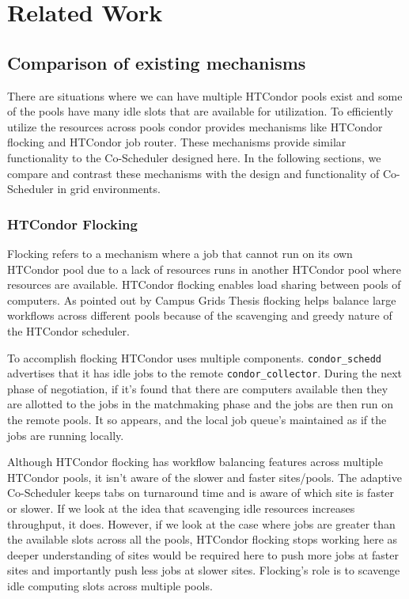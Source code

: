 \documentclass[ms,electronic,double]{nuthesis}
\begin{document}
\chapter{Related Work}

\section{Comparison of existing mechanisms}
There are situations where we can have multiple HTCondor pools exist and some of 
the pools have many idle slots that are available for utilization. To efficiently utilize the resources across pools condor provides 
mechanisms like HTCondor flocking and HTCondor job router. These mechanisms 
provide similar functionality to the Co-Scheduler designed here. In the following sections, we compare 
and contrast these mechanisms with the design and functionality of Co-Scheduler in grid environments.

\subsection{HTCondor Flocking}
Flocking refers to a mechanism where a job that cannot run on its own HTCondor pool 
due to a lack of resources runs in another HTCondor pool where resources are 
available. HTCondor flocking enables load sharing between pools of computers. As 
pointed out by Campus Grids Thesis\cite{derekThesis} flocking helps balance large workflows across different pools because of the scavenging and greedy nature 
of the HTCondor scheduler.

To accomplish flocking HTCondor uses multiple components. 
\texttt{condor\_schedd} advertises that it has idle jobs to the remote \texttt{condor\_collector}. During the next phase of negotiation, if it's found that there are computers 
available then they are allotted to the jobs in the matchmaking phase and the 
jobs are then run on the remote pools. It so appears, and the local job queue's maintained as if 
the jobs are running locally. 

Although HTCondor flocking has workflow balancing features across multiple HTCondor 
pools, it isn't aware of the slower and faster sites/pools. The adaptive Co-Scheduler 
keeps tabs on turnaround time and is aware of which site is faster or slower. If we 
look at the idea that scavenging idle resources increases throughput, it does. However, if we look at the case where jobs are greater than the available slots 
across all the pools, HTCondor flocking stops working here as deeper understanding of sites
would be required here to push more jobs at faster sites and importantly push less jobs
at slower sites. Flocking's role is to scavenge idle computing slots across multiple pools. 
\end{document}
